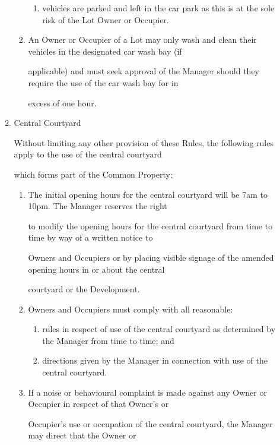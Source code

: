 \documentclass{article}
\begin{document}
\begin{enumerate}[label=\arabic*.]
\begin{enumerate}[label=\arabic{enumi}.\arabic*.]
\begin{enumerate}[label=(\arabic*)]
\begin{enumerate}[label=(\alph*)]
\item  vehicles are parked and left in the car park as this is at the sole risk of the Lot Owner or Occupier. 

\end{enumerate}
\item  An Owner or Occupier of a Lot may only wash and clean their vehicles in the designated car wash bay (if 

applicable) and must seek approval of the Manager should they require the use of the car wash bay for in 

excess of one hour. 

\end{enumerate}
\item  Central Courtyard 

Without limiting any other provision of these Rules, the following rules apply to the use of the central courtyard 

which forms part of the Common Property: 

\begin{enumerate}[label=(\arabic*)]
\item  The initial opening hours for the central courtyard will be 7am to 10pm. The Manager reserves the right 

to modify the opening hours for the central courtyard from time to time by way of a written notice to 

Owners and Occupiers or by placing visible signage of the amended opening hours in or about the central 

courtyard or the Development.  

\newpage

\item  Owners and Occupiers must comply with all reasonable: 

\begin{enumerate}[label=(\alph*)]
\item  rules in respect of use of the central courtyard as determined by the Manager from time to time; and 

\item  directions given by the Manager in connection with use of the central courtyard. 

\end{enumerate}
\item  If a noise or behavioural complaint is made against any Owner or Occupier in respect of that Owner’s or 

Occupier’s use or occupation of the central courtyard, the Manager may direct that the Owner or 


\end{enumerate}
\end{enumerate}
\end{enumerate}
\end{document}
